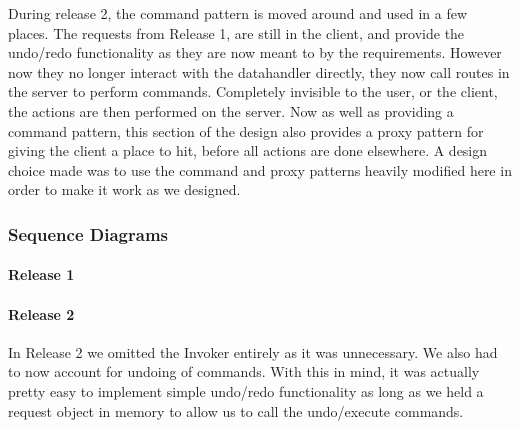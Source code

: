 \indent
During release 2, the command pattern is moved around and used in a few places.
The requests from Release 1, are still in the client, and provide the undo/redo functionality as they are now meant to by the requirements.
However now they no longer interact with the datahandler directly, they now call routes in the server to perform commands.
Completely invisible to the user, or the client, the actions are then performed on the server.
Now as well as providing a command pattern, this section of the design also provides a proxy pattern for giving the client a place to hit, before all actions are done elsewhere.
A design choice made was to use the command and proxy patterns heavily modified here in order to make it work as we designed.

\subsubsection{Sequence Diagrams}

\paragraph{Release 1}

\begin{center}
\end{center}

\paragraph{Release 2}

\indent
In Release 2 we omitted the Invoker entirely as it was unnecessary. We also had to now account for undoing of commands. With this in mind, it was actually pretty easy to implement simple undo/redo functionality as long as we held a request object in memory to allow us to call the undo/execute commands.

